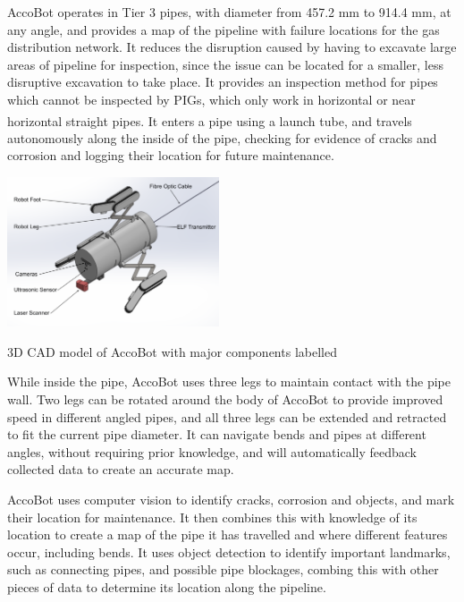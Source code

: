 \documentclass[11pt]{article}		%
\newcommand{\supercite}[1]{\textsuperscript{\cite{#1}}}		%
\begin{document}
			AccoBot operates in Tier 3 pipes, with diameter from 457.2 mm to 914.4 mm, at any angle, and provides a map of the pipeline with failure locations for the gas distribution network.
			It reduces the disruption caused by having to excavate large areas of pipeline for inspection, since the issue can be located for a smaller, less disruptive excavation to take place.
			It provides an inspection method for pipes which cannot be inspected by PIGs, which only work in horizontal or near horizontal straight pipes\supercite{mills2017advances}.
			It enters a pipe using a launch tube, and travels autonomously along the inside of the pipe, checking for evidence of cracks and corrosion and logging their location for future maintenance.
			
			\begin{floatingfigure}[r]{0.5\textwidth}
			\centering
				\includegraphics[width = 0.47\textwidth]{overviewCADLabels}
				\caption{3D CAD model of AccoBot with major components labelled}
				\label{3DSketch}
			\end{floatingfigure}
			
			While inside the pipe, AccoBot uses three legs to maintain contact with the pipe wall.
			Two legs can be rotated around the body of AccoBot to provide improved speed in different angled pipes, and all three legs can be extended and retracted to fit the current pipe diameter.
			It can navigate bends and pipes at different angles, without requiring prior knowledge, and will automatically feedback collected data to create an accurate map.
			
					
			AccoBot uses computer vision to identify cracks, corrosion and objects, and mark their location for maintenance.
			It then combines this with knowledge of its location to create a map of the pipe it has travelled and where different features occur, including bends.
			It uses object detection to identify important landmarks, such as connecting pipes, and possible pipe blockages, combing this with other pieces of data to determine its location along the pipeline.
			
\end{document}
